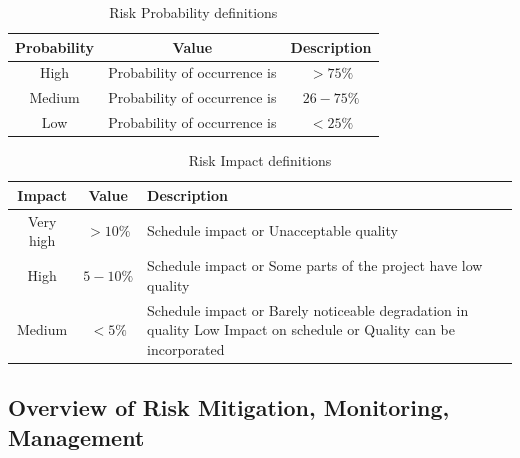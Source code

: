 \documentclass[oneside,a4paper,12pt]{report}
\begin{document}
\begin{table}[!htbp]
\begin{center}
\def\arraystretch{1.5}
\begin{tabular}{| c | c | c |}
\hline
Probability & Value &	Description \\ \hline
High &	Probability of occurrence is &  $ > 75 \% $ \\ \hline
Medium &	Probability of occurrence is  & $26-75 \% $ \\ \hline
Low	& Probability of occurrence is & $ < 25 \% $ \\ \hline
\end{tabular}
\end{center}
\caption{Risk Probability definitions \cite{bookPressman}}
\label{tab:riskdef}
\end{table}

\begin{table}[!htbp]
\begin{center}
\def\arraystretch{1.5}
\begin{tabularx}{\textwidth}{| c | c | X |}
\hline
Impact & Value	& Description \\ \hline
Very high &	$> 10 \%$ & Schedule impact or Unacceptable quality \\ \hline
High &	$5-10 \%$ & Schedule impact or Some parts of the project have low quality \\ \hline
Medium	& $ < 5 \% $ & Schedule impact or Barely noticeable degradation in quality Low	Impact on schedule or Quality can be incorporated \\ \hline
\end{tabularx}
\end{center}
\caption{Risk Impact definitions \cite{bookPressman}}
\label{tab:riskImpactDef}
\end{table}

\subsection{Overview of Risk Mitigation, Monitoring, Management}
\end{document}
